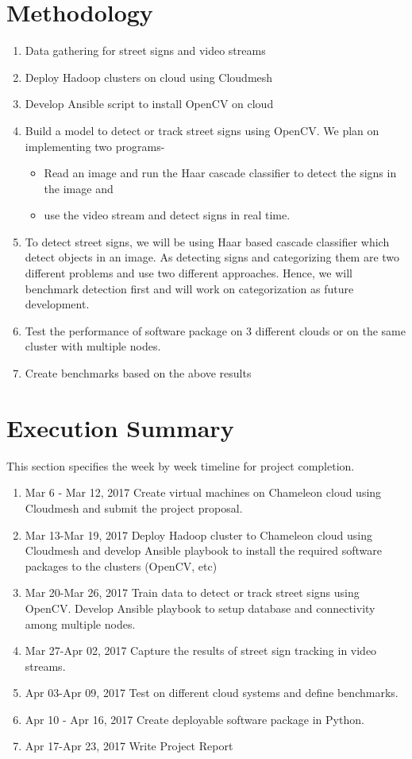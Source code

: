 \documentclass[9pt,twocolumn,twoside]{../../styles/osajnl}
\begin{document}
\section{Methodology}
\begin{enumerate}
\item Data gathering for street signs and video streams
\item Deploy Hadoop clusters on cloud using Cloudmesh
\item Develop Ansible script to install OpenCV on cloud
\item Build a model to detect or track street signs using OpenCV. We
  plan on implementing two programs-
    \begin{itemize}
    \item Read an image and run the Haar cascade classifier to detect
      the signs in the image and
    \item use the video stream and detect signs in real time.
    \end{itemize}
\item To detect street signs, we will be using Haar based cascade
  classifier which detect objects in an image. As detecting signs and
  categorizing them are two different problems and use two different
  approaches. Hence, we will benchmark detection first and will work
  on categorization as future development.
\item Test the performance of software package on 3 different clouds
  or on the same cluster with multiple nodes.
\item Create benchmarks based on the above results

\end{enumerate}


\section{Execution Summary}
This section specifies the week by week timeline for project
completion.
\begin{enumerate}
\item {Mar 6 - Mar 12, 2017} Create virtual machines on Chameleon
  cloud using Cloudmesh and submit the project proposal.
\item {Mar 13-Mar 19, 2017} Deploy Hadoop cluster to Chameleon cloud
  using Cloudmesh and develop Ansible playbook to install the required
  software packages to the clusters (OpenCV, etc)
\item {Mar 20-Mar 26, 2017} Train data to detect or track street signs
  using OpenCV. Develop Ansible playbook to setup database and
  connectivity among multiple nodes.
\item {Mar 27-Apr 02, 2017} Capture the results of street sign
  tracking in video streams.
\item {Apr 03-Apr 09, 2017} Test on different cloud systems and define
  benchmarks.
\item {Apr 10 - Apr 16, 2017} Create deployable software package in
  Python.
\item {Apr 17-Apr 23, 2017} Write Project Report
\end{enumerate}
\end{document}
